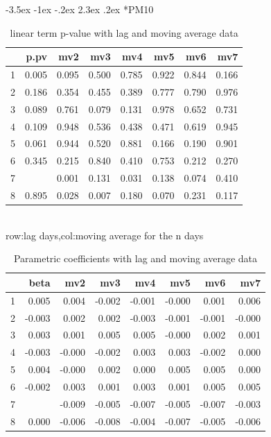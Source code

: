\documentclass[a4paper, 12pt]{article}
\makeatletter
\def\large{\fontsize{14}{20}\selectfont}
\renewcommand\subsection{\@startsection {subsection}{1}{\z@}%
                                   {-3.5ex \@plus -1ex \@minus -.2ex}%
                                   {2.3ex \@plus.2ex}%
                                   {\centering\normalfont\large\bfseries}}
\makeatother
\begin{document}
\subsection*{PM10}
\begin{table}[h]
\centering
\caption{linear term p-value with lag and moving average data}
\begin{tabular}{rrrrrrrr}
  \hline
 & p.pv & mv2 & mv3 & mv4 & mv5 & mv6 & mv7 \\
  \hline
1 & 0.005 & 0.095 & 0.500 & 0.785 & 0.922 & 0.844 & 0.166 \\
  2 & 0.186 & 0.354 & 0.455 & 0.389 & 0.777 & 0.790 & 0.976 \\
  3 & 0.089 & 0.761 & 0.079 & 0.131 & 0.978 & 0.652 & 0.731 \\
  4 & 0.109 & 0.948 & 0.536 & 0.438 & 0.471 & 0.619 & 0.945 \\
  5 & 0.061 & 0.944 & 0.520 & 0.881 & 0.166 & 0.190 & 0.901 \\
  6 & 0.345 & 0.215 & 0.840 & 0.410 & 0.753 & 0.212 & 0.270 \\
  7 & \color{red}{0.000} & 0.001 & 0.131 & 0.031 & 0.138 & 0.074 & 0.410 \\
  8 & 0.895 & 0.028 & 0.007 & 0.180 & 0.070 & 0.231 & 0.117 \\
   \hline
\end{tabular}
\\row:lag days,col:moving average for the n days
\end{table}

\begin{table}[h]
\centering
\caption{Parametric coefficients with lag and moving average data}
\begin{tabular}{rrrrrrrr}
  \hline
 & beta & mv2 & mv3 & mv4 & mv5 & mv6 & mv7 \\
  \hline
1 & 0.005 & 0.004 & -0.002 & -0.001 & -0.000 & 0.001 & 0.006 \\
  2 & -0.003 & 0.002 & 0.002 & -0.003 & -0.001 & -0.001 & -0.000 \\
  3 & 0.003 & 0.001 & 0.005 & 0.005 & -0.000 & 0.002 & 0.001 \\
  4 & -0.003 & -0.000 & -0.002 & 0.003 & 0.003 & -0.002 & 0.000 \\
  5 & 0.004 & -0.000 & 0.002 & 0.000 & 0.005 & 0.005 & 0.000 \\
  6 & -0.002 & 0.003 & 0.001 & 0.003 & 0.001 & 0.005 & 0.005 \\
  7 & \color{red}{-0.008} & -0.009 & -0.005 & -0.007 & -0.005 & -0.007 & -0.003 \\
  8 & 0.000 & -0.006 & -0.008 & -0.004 & -0.007 & -0.005 & -0.006 \\
   \hline
\end{tabular}
\end{table}
\clearpage
\end{document}
